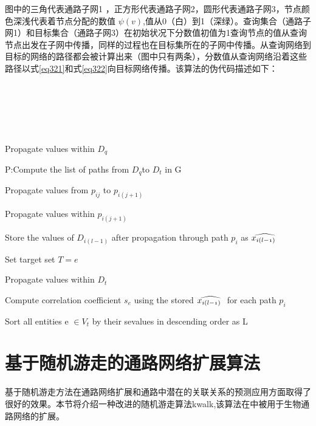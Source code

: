 图中的三角代表通路子网1 ，正方形代表通路子网2，圆形代表通路子网3，节点颜色深浅代表着节点分配的数值 $\psi (v)$,值从0（白）到1（深绿）。查询集合（通路子网1）和目标集合（通路子网3）在初始状况下分数值初值为1查询节点的值从查询节点出发在子网中传播，同样的过程也在目标集所在的子网中传播。从查询网络到目标的网络的路径都会被计算出来（图中只有两条），分数值从查询网络沿着这些路径以式\ref{eq321}和式\ref{eq322}向目标网络传播。该算法的伪代码描述如下：
\\
\\
\\
\\
\\
\\



\begin{algorithm}
%

Propagate values within $D_{q}$

P:Compute the list of paths from $D_{q}$to $D_{t}$ in G

{
	{
		Propagate values from $p_{ij}$ to $p_{i(j+1)}$
		
		Propagate values within $p_{i(j+1)}$
    }

    Store the values of $D_{i(l−1)}$ after propagation through path $p_{i}$ as $\mathnormal{\widehat{x_{i( l-1)} \ }}$
 }

{
	Set target set $T = {e}$

	Propagate values within $D_{t}$

	Compute correlation coefficient $s_{e}$ using the stored $ \mathnormal{\widehat{x_{i( l-1)} \ }}$ for each path $p_{i}$
}

Sort all entities e $\in V_{t}$ by their sevalues in descending order as L

\end{algorithm}





\section{基于随机游走的通路网络扩展算法}
基于随机游走方法在通路网络扩展和通路中潜在的关联关系的预测应用方面取得了很好的效果。本节将介绍一种改进的随机游走算法kwalk\cite{},该算法在\cite{}中被用于生物通路网络的扩展。


